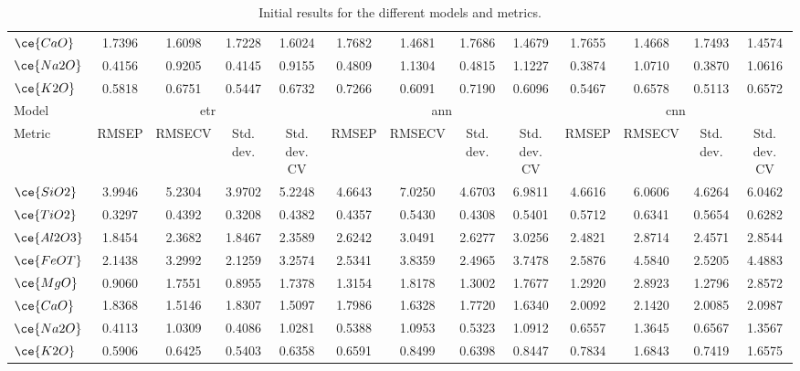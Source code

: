 \begin{table*}[]
{\begin{tabular}{l|cccc|cccc|cccc}
$\ce{CaO}$ & 1.7396 & 1.6098 & 1.7228 & 1.6024 & 1.7682 & 1.4681 & 1.7686 & 1.4679 & 1.7655 & 1.4668 & 1.7493 & 1.4574 \\
$\ce{Na2O}$ & 0.4156 & 0.9205 & 0.4145 & 0.9155 & 0.4809 & 1.1304 & 0.4815 & 1.1227 & 0.3874 & 1.0710 & 0.3870 & 1.0616 \\
$\ce{K2O}$ & 0.5818 & 0.6751 & 0.5447 & 0.6732 & 0.7266 & 0.6091 & 0.7190 & 0.6096 & 0.5467 & 0.6578 & 0.5113 & 0.6572 \\
\hline
Model & \multicolumn{4}{c}{\gls{etr}} & \multicolumn{4}{c}{\gls{ann}} & \multicolumn{4}{c}{\gls{cnn}} \\
Metric & \multicolumn{1}{c}{RMSEP} & \multicolumn{1}{c}{RMSECV} & \multicolumn{1}{c}{Std. dev.} & \multicolumn{1}{c}{Std. dev. CV} & \multicolumn{1}{c}{RMSEP} & \multicolumn{1}{c}{RMSECV} & \multicolumn{1}{c}{Std. dev.} & \multicolumn{1}{c}{Std. dev. CV} & \multicolumn{1}{c}{RMSEP} & \multicolumn{1}{c}{RMSECV} & \multicolumn{1}{c}{Std. dev.} & \multicolumn{1}{c}{Std. dev. CV} \\
\hline
$\ce{SiO2}$ & 3.9946 & 5.2304 & 3.9702 & 5.2248 & 4.6643 & 7.0250 & 4.6703 & 6.9811 & 4.6616 & 6.0606 & 4.6264 & 6.0462 \\
$\ce{TiO2}$ & 0.3297 & 0.4392 & 0.3208 & 0.4382 & 0.4357 & 0.5430 & 0.4308 & 0.5401 & 0.5712 & 0.6341 & 0.5654 & 0.6282 \\
$\ce{Al2O3}$ & 1.8454 & 2.3682 & 1.8467 & 2.3589 & 2.6242 & 3.0491 & 2.6277 & 3.0256 & 2.4821 & 2.8714 & 2.4571 & 2.8544 \\
$\ce{FeOT}$ & 2.1438 & 3.2992 & 2.1259 & 3.2574 & 2.5341 & 3.8359 & 2.4965 & 3.7478 & 2.5876 & 4.5840 & 2.5205 & 4.4883 \\
$\ce{MgO}$ & 0.9060 & 1.7551 & 0.8955 & 1.7378 & 1.3154 & 1.8178 & 1.3002 & 1.7677 & 1.2920 & 2.8923 & 1.2796 & 2.8572 \\
$\ce{CaO}$ & 1.8368 & 1.5146 & 1.8307 & 1.5097 & 1.7986 & 1.6328 & 1.7720 & 1.6340 & 2.0092 & 2.1420 & 2.0085 & 2.0987 \\
$\ce{Na2O}$ & 0.4113 & 1.0309 & 0.4086 & 1.0281 & 0.5388 & 1.0953 & 0.5323 & 1.0912 & 0.6557 & 1.3645 & 0.6567 & 1.3567 \\
$\ce{K2O}$ & 0.5906 & 0.6425 & 0.5403 & 0.6358 & 0.6591 & 0.8499 & 0.6398 & 0.8447 & 0.7834 & 1.6843 & 0.7419 & 1.6575 \\
\hline
\end{tabular}%
}
\caption{Initial results for the different models and metrics.}
\end{table*}
